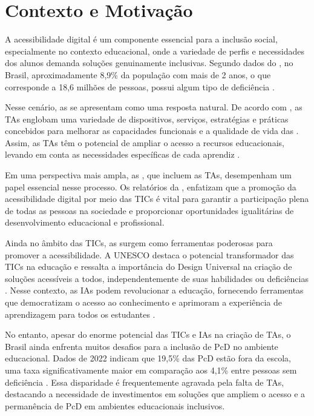 \section{Contexto e Motivação}

A acessibilidade digital é um componente essencial para a inclusão social, especialmente no contexto educacional, onde a variedade de perfis e necessidades dos alunos demanda soluções genuinamente inclusivas. Segundo dados do , no Brasil, aproximadamente 8,9\% da população com mais de 2 anos, o que corresponde a 18,6 milhões de pessoas, possui algum tipo de deficiência \cite{IBGE2023}.

Nesse cenário, as  se apresentam como uma resposta natural. De acordo com , as TAs englobam uma variedade de dispositivos, serviços, estratégias e práticas concebidos para melhorar as capacidades funcionais e a qualidade de vida das . Assim, as TAs têm o potencial de ampliar o acesso a recursos educacionais, levando em conta as necessidades específicas de cada aprendiz \cite{UNESCO2023, GovBr2023}. 

Em uma perspectiva mais ampla, as , que incluem as TAs, desempenham um papel essencial nesse processo. Os relatórios da , enfatizam que a promoção da acessibilidade digital por meio das TICs é vital para garantir a participação plena de todas as pessoas na sociedade e proporcionar oportunidades igualitárias de desenvolvimento educacional e profissional.


Ainda no âmbito das TICs, as  surgem como ferramentas poderosas para promover a acessibilidade. A UNESCO destaca o potencial transformador das TICs na educação e ressalta a importância do Design Universal na criação de soluções acessíveis a todos, independentemente de suas habilidades ou deficiências \cite{UNESCO2023, GovBr2023}. Nesse contexto, as IAs podem revolucionar a educação, fornecendo ferramentas que democratizam o acesso ao conhecimento e aprimoram a experiência de aprendizagem para todos os estudantes \cite{Holmes2019,UNESCO2024}.

No entanto, apesar do enorme potencial das TICs e IAs na criação de TAs, o Brasil ainda enfrenta muitos desafios para a inclusão de PcD no ambiente educacional. Dados de 2022 indicam que 19,5\% das PcD estão fora da escola, uma taxa significativamente maior em comparação aos 4,1\% entre pessoas sem deficiência \cite{IBGE2023}. Essa disparidade é frequentemente agravada pela falta de TAs, destacando a necessidade de investimentos em soluções que ampliem o acesso e a permanência de PcD em ambientes educacionais inclusivos.

